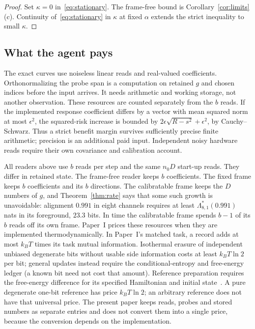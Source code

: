 \documentclass[12pt]{article}
\theoremstyle{definition}
\begin{document}
\begin{proof}
Set $\kappa=0$ in~\eqref{eq:stationary}. The frame-free bound is Corollary~\ref{cor:limits}(c). Continuity of~\eqref{eq:stationary} in $\kappa$ at fixed $\alpha$ extends the strict inequality to small $\kappa$.
\end{proof}

\subsection{What the agent pays}
\label{subsec:costs}

The exact curves use noiseless linear reads and real-valued coefficients.
Orthonormalizing the probe span is a computation on retained $g$ and
chosen indices before the input arrives. It needs arithmetic and working
storage, not another observation. These resources are counted separately
from the $b$ reads. If the implemented response coefficient differs by
a vector with mean squared norm at most $\epsilon^2$, the squared-risk
increase is bounded by
$2\epsilon\sqrt{R-s^2}+\epsilon^2$, by Cauchy--Schwarz.
Thus a strict benefit margin survives sufficiently precise finite
arithmetic; precision is an additional paid input. Independent noisy
hardware reads require their own covariance and calibration account.

All readers above use $b$ reads per step and the same $n_0D$ start-up reads. They differ in retained state. The frame-free reader keeps $b$ coefficients. The fixed frame keeps $b$ coefficients and its $b$ directions. The calibratable frame keeps the $D$ numbers of $g$, and Theorem~\ref{thm:rate} says that some such growth is unavoidable: alignment $0.991$ in eight channels requires at least $\Lambda^*_{8,1}(0.991)$ nats in its foreground, $23.3$ bits. In time the calibratable frame spends $b-1$ of its $b$ reads off its own frame. Paper~I prices these resources when they are implemented thermodynamically. In Paper~I's matched task, a record adds at most $k_BT$ times its task mutual information. Isothermal erasure of independent unbiased degenerate bits without usable side information costs at least $k_BT\ln2$ per bit; general updates instead require the conditional-entropy and free-energy ledger (a known bit need not cost that amount). Reference preparation requires the free-energy difference for its specified Hamiltonian and initial state~\cite{Liu2026TDOME_I}. A pure degenerate one-bit reference has price $k_BT\ln2$; an arbitrary reference does not have that universal price. The present paper keeps reads, probes and stored numbers as separate entries and does not convert them into a single price, because the conversion depends on the implementation.
\end{document}
